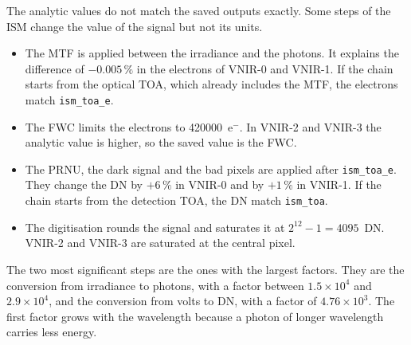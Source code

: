 \begin{table}[H]
\centering
\small
\caption{Unit conversion factors per band. The two largest factors of each band are in bold.}
\label{tab:ism_units_factors}

\end{table}

\begin{table}[H]
\centering
\small
\caption{Analytic conversion at the central pixel compared with the saved outputs.}
\label{tab:ism_units_check}

\end{table}

The analytic values do not match the saved outputs exactly.
Some steps of the ISM change the value of the signal but not its units.
\begin{itemize}
\item The MTF is applied between the irradiance and the photons. It explains the difference of $-0.005\,\%$ in the electrons of VNIR-0 and VNIR-1. If the chain starts from the optical TOA, which already includes the MTF, the electrons match \texttt{ism\_toa\_e}.
\item The FWC limits the electrons to 420000~e$^-$. In VNIR-2 and VNIR-3 the analytic value is higher, so the saved value is the FWC.
\item The PRNU, the dark signal and the bad pixels are applied after \texttt{ism\_toa\_e}. They change the DN by $+6\,\%$ in VNIR-0 and by $+1\,\%$ in VNIR-1. If the chain starts from the detection TOA, the DN match \texttt{ism\_toa}.
\item The digitisation rounds the signal and saturates it at $2^{12}-1 = 4095$~DN. VNIR-2 and VNIR-3 are saturated at the central pixel.
\end{itemize}

The two most significant steps are the ones with the largest factors.
They are the conversion from irradiance to photons, with a factor between $1.5\times10^{4}$ and $2.9\times10^{4}$, and the conversion from volts to DN, with a factor of $4.76\times10^{3}$.
The first factor grows with the wavelength because a photon of longer wavelength carries less energy.

